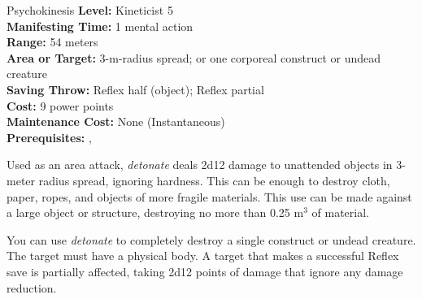 {Psychokinesis}
{
	\textbf{Level:}
	Kineticist 5\\
	\textbf{Manifesting Time:}
	1 mental action\\
	\textbf{Range:}
	54 meters\\
	\textbf{Area or Target:}
	3-m-radius spread; or one corporeal construct or undead creature\\
	\textbf{Saving Throw:}
	Reflex half (object); Reflex partial\\
	\textbf{Cost:}
	9 power points\\
	\textbf{Maintenance Cost:}
	None (Instantaneous)\\
	\textbf{Prerequisites:}
	, \\
}
{
	Used as an area attack, \emph{detonate} deals 2d12 damage to unattended objects in 3-meter radius spread, ignoring hardness. This can be enough to destroy cloth, paper, ropes, and objects of more fragile materials. This use can be made against a large object or structure, destroying no more than 0.25 m$^3$ of material.

	You can use \emph{detonate} to completely destroy a single construct or undead creature. The target must have a physical body. A target that makes a successful Reflex save is partially affected, taking 2d12 points of damage that ignore any damage reduction.
}